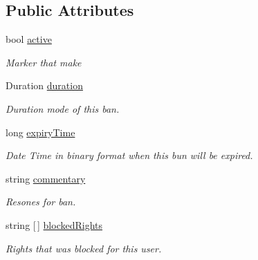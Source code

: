 \subsection*{Public Attributes}
\begin{DoxyCompactItemize}
\item 
bool \mbox{\hyperlink{struct_authority_controller_1_1_data_1_1_personal_1_1_ban_information_a8aa7fea19a5b2acce008883fcda629b2}{active}}
\begin{DoxyCompactList}\small\item\em Marker that make \end{DoxyCompactList}\item 
Duration \mbox{\hyperlink{struct_authority_controller_1_1_data_1_1_personal_1_1_ban_information_a68241c910c08c5659c1fcbc86e9ee8a8}{duration}}
\begin{DoxyCompactList}\small\item\em Duration mode of this ban. \end{DoxyCompactList}\item 
long \mbox{\hyperlink{struct_authority_controller_1_1_data_1_1_personal_1_1_ban_information_a6b22bf736f47aea1c0cd54e59b5d12cc}{expiry\+Time}}
\begin{DoxyCompactList}\small\item\em Date Time in binary format when this bun will be expired. \end{DoxyCompactList}\item 
string \mbox{\hyperlink{struct_authority_controller_1_1_data_1_1_personal_1_1_ban_information_a4b408f380448e918f8915510aaf4c159}{commentary}}
\begin{DoxyCompactList}\small\item\em Resones for ban. \end{DoxyCompactList}\item 
string \mbox{[}$\,$\mbox{]} \mbox{\hyperlink{struct_authority_controller_1_1_data_1_1_personal_1_1_ban_information_a3bfad0aa4906e8e60de00e93e4ee52a8}{blocked\+Rights}}
\begin{DoxyCompactList}\small\item\em Rights that was blocked for this user. \end{DoxyCompactList}\end{DoxyCompactItemize}

